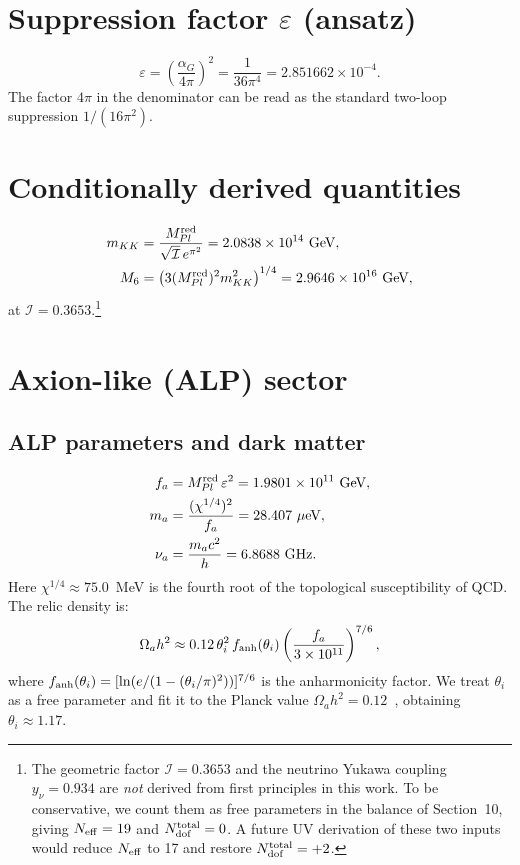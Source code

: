 \documentclass[12pt,a4paper]{article}
\numberwithin{equation}{section}
\begin{document}
\section{Suppression factor \(\varepsilon\) (ansatz)}
\begin{equation}
\varepsilon = \left(\frac{\alpha_G}{4\pi}\right)^2 = \frac{1}{36\pi^4} = 2.851662\times10^{-4}.
\end{equation}
The factor \(4\pi\) in the denominator can be read as the standard two-loop suppression \(1/(16\pi^2)\).

\section{Conditionally derived quantities}
\begin{align}
m_{KK} &= \frac{M_{Pl}^{\rm red}}{\sqrt{\mathcal{I}}\,e^{\pi^2}} = 2.0838\times10^{14}~\text{GeV}, \\
M_6 &= \left(3 (M_{Pl}^{\rm red})^2 m_{KK}^2\right)^{1/4} = 2.9646\times10^{16}~\text{GeV},
\end{align}
at \(\mathcal{I} = 0.3653\).\footnote{The geometric factor \(\mathcal{I} = 0.3653\) and the neutrino Yukawa coupling \(y_\nu = 0.934\) are \emph{not} derived from first principles in this work. To be conservative, we count them as free parameters in the balance of Section~10, giving $N_{\rm eff}=19$ and $N_{\rm dof}^{\rm total}=0$. A future UV derivation of these two inputs would reduce $N_{\rm eff}$ to 17 and restore $N_{\rm dof}^{\rm total}=+2$.}

\section{Axion-like (ALP) sector}
\subsection{ALP parameters and dark matter}
\begin{align}
f_a &= M_{Pl}^{\rm red}\,\varepsilon^2 = 1.9801\times10^{11}~\text{GeV}, \\
m_a &= \frac{(\chi^{1/4})^2}{f_a} = 28.407~\mu\text{eV}, \\
\nu_a &= \frac{m_a c^2}{h} = 6.8688~\text{GHz}.
\end{align}
Here \(\chi^{1/4} \approx 75.0\)~MeV is the fourth root of the topological susceptibility of QCD. The relic density is:
\begin{equation}
\Omega_a h^2 \approx 0.12\,\theta_i^2\, f_{\rm anh}(\theta_i)\left(\frac{f_a}{3\times10^{11}}\right)^{7/6},
\end{equation}
where \(f_{\rm anh}(\theta_i) = [\ln(e/(1-(\theta_i/\pi)^2))]^{7/6}\) is the anharmonicity factor. We treat $\theta_i$ as a free parameter and fit it to the Planck value $\Omega_a h^2 = 0.12$~\cite{Planck2018}, obtaining \(\theta_i \approx 1.17\).
\end{document}
